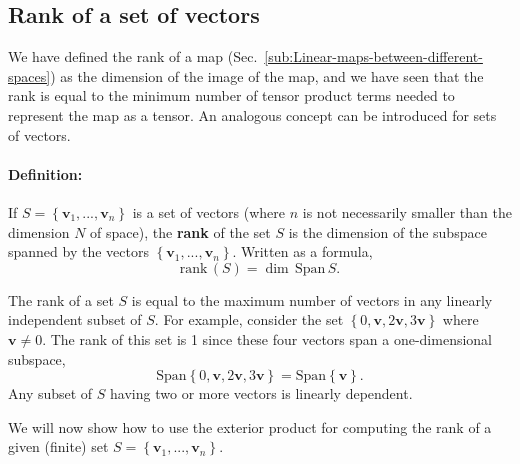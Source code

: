 \subsection{Rank of a set of vectors\label{sub:Rank-of-a-set-of-vectors}}

We have defined the rank of a map (Sec.~\ref{sub:Linear-maps-between-different-spaces})
as the dimension of the image of the map, and we have seen that the
rank is equal to the minimum number of tensor product terms needed
to represent the map as a tensor. An analogous concept can be introduced
for sets of vectors.


\paragraph{Definition:}

If $S=\left\{ \mathbf{v}_{1},...,\mathbf{v}_{n}\right\} $ is a set
of vectors (where $n$ is not necessarily smaller than the dimension
$N$ of space), the \textbf{rank} of the set $S$ is the dimension
of the subspace spanned by the vectors $\left\{ \mathbf{v}_{1},...,\mathbf{v}_{n}\right\} $.
Written as a formula,\[
\text{rank}\,(S)=\dim\,\text{Span}\, S.\]


The rank of a set $S$ is equal to the maximum number of vectors in
any linearly independent subset of $S$. For example, consider the
set $\left\{ 0,\mathbf{v},2\mathbf{v},3\mathbf{v}\right\} $ where
$\mathbf{v}\neq0$. The rank of this set is 1 since these four vectors
span a one-dimen\-sion\-al subspace,\[
\text{Span}\left\{ 0,\mathbf{v},2\mathbf{v},3\mathbf{v}\right\} =\text{Span}\left\{ \mathbf{v}\right\} .\]
Any subset of $S$ having two or more vectors is linearly dependent.

We will now show how to use the exterior product for computing the
rank of a given (finite) set $S=\left\{ \mathbf{v}_{1},...,\mathbf{v}_{n}\right\} $. 


